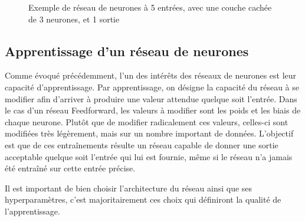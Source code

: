 \begin{figure}
    \centering
    \caption{Exemple de réseau de neurones à 5 entrées, avec une couche cachée de 3 neurones, et 1 sortie}
\end{figure}{}




\subsection{Apprentissage d'un réseau de neurones}
Comme évoqué précédemment, l'un des intérêts des réseaux de neurones est leur capacité d'apprentissage. Par apprentissage, on désigne la capacité du réseau à se modifier afin d'arriver à produire une valeur attendue quelque soit l'entrée. Dans le cas d'un réseau Feedforward, les valeurs à modifier sont les poids et les biais de chaque neurone.
Plutôt que de modifier radicalement ces valeurs, celles-ci sont modifiées très légèrement, mais sur un nombre important de données. L'objectif est que de ces entraînements résulte un réseau capable de donner une sortie acceptable quelque soit l'entrée qui lui est fournie, même si le réseau n'a jamais été entraîné sur cette entrée précise.
\par
Il est important de bien choisir l'architecture du réseau ainsi que ses hyperparamètres, c'est majoritairement ces choix qui définiront la qualité de l'apprentissage. 

